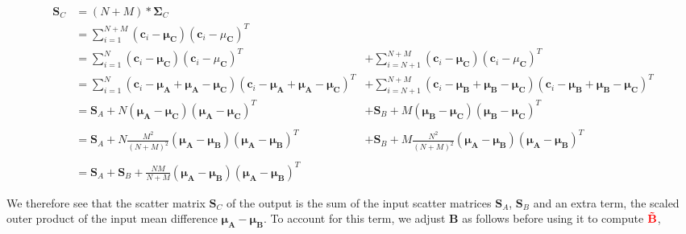\begin{changemargin}{-0.5in}{0in}

\begin{equation}
\begin{array}{llll}
\mathbf{S}_C &= (N+M) * \mathbf{\Sigma}_C \\
&= \sum\limits_{i=1}^{N+M} (\mathbf{c}_i-\mathbf{\mu}_\mathbf{C})(\mathbf{c}_i-\mu_\mathbf{C})^T \\
&= \sum\limits_{i=1}^{N} (\mathbf{c}_i-\mathbf{\mu}_\mathbf{C})(\mathbf{c}_i-\mu_\mathbf{C})^T &+ \sum\limits_{i=N+1}^{N+M} (\mathbf{c}_i-\mathbf{\mu}_\mathbf{C})(\mathbf{c}_i-\mu_\mathbf{C})^T\\
&= \sum\limits_{i=1}^{N}
 (\mathbf{c}_i-\mathbf{\mu}_\mathbf{A} +\mathbf{\mu}_\mathbf{A} - \mathbf{\mu}_\mathbf{C}) (\mathbf{c}_i-\mathbf{\mu}_\mathbf{A} +\mathbf{\mu}_\mathbf{A} - \mathbf{\mu}_\mathbf{C})^T &+  \sum\limits_{i=N+1}^{N+M}
 (\mathbf{c}_i-\mathbf{\mu}_\mathbf{B} +\mathbf{\mu}_\mathbf{B} - \mathbf{\mu}_\mathbf{C}) (\mathbf{c}_i-\mathbf{\mu}_\mathbf{B} +\mathbf{\mu}_\mathbf{B} - \mathbf{\mu}_\mathbf{C})^T \\
&=\mathbf{S}_A + N(\mathbf{\mu}_\mathbf{A} - \mathbf{\mu}_\mathbf{C})(\mathbf{\mu}_\mathbf{A} - \mathbf{\mu}_\mathbf{C})^T &+ \mathbf{S}_B +  M(\mathbf{\mu}_\mathbf{B} - \mathbf{\mu}_\mathbf{C})(\mathbf{\mu}_\mathbf{B} - \mathbf{\mu}_\mathbf{C})^T\\\\

&=\mathbf{S}_A + N\frac{M^2}{(N+M)^2}(\mathbf{\mu}_\mathbf{A} - \mathbf{\mu}_\mathbf{B})(\mathbf{\mu}_\mathbf{A} - \mathbf{\mu}_\mathbf{B})^T  &+\mathbf{S}_B +  M\frac{N^2}{(N+M)^2}(\mathbf{\mu}_\mathbf{A} - \mathbf{\mu}_\mathbf{B})(\mathbf{\mu}_\mathbf{A} - \mathbf{\mu}_\mathbf{B})^T\\\\

&=\mathbf{S}_A + \mathbf{S}_B + \frac{NM}{N+M}(\mathbf{\mu}_\mathbf{A} - \mathbf{\mu}_\mathbf{B})(\mathbf{\mu}_\mathbf{A} - \mathbf{\mu}_\mathbf{B})^T  
\end{array}
\end{equation}
\end{changemargin}


We therefore see that the scatter matrix $\mathbf{S}_C$ of the output is the sum of the input scatter matrices $\mathbf{S}_A$, $\mathbf{S}_B$ and an extra term, the scaled outer product of the input mean difference $\mathbf{\mu}_\mathbf{A} - \mathbf{\mu}_\mathbf{B}$.  To account for this term, we adjust $\mathbf{B}$ as follows before using it to compute  ${\color{red}\mathbf{\tilde{B}}}$,

